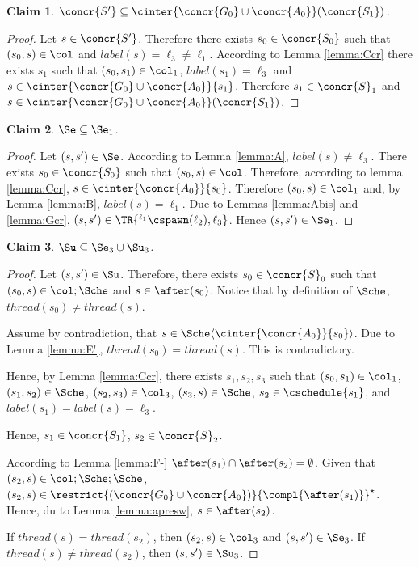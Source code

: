 \documentclass[12pt]{article}
\let\vide\emptyset \let\appartient\in
\let\firstunion\cup
\let\firstinter\cap
\let\emptyset\vide \let\in\appartient
\let\cup\firstunion
\let\cap\firstinter
\renewcommand{\subset}{\subseteq}
\newcommand{\li}[1]{ {}^{\ell_{#1}}  }
\newcommand{\lbl}{\mathit{label}}
\newcommand{\thread}{\mathit{thread}}
\newtheorem{claim}{Claim}
\begin{document}
\begin{claim}
 \(\concr{S'}\subset\cinter{\concr{G_0}\cup\concr{A_0}}(\concr{S_1})\).
\end{claim}
\begin{proof}
 Let \(s\in\concr{S'}\). Therefore there exists \(s_0\in\concr{S_0}\) such that \((s_0,s)\in\col\) and \(\lbl(s)=\ell_3\neq\ell_1\).
 According to Lemma \ref{lemma:Ccr} there exists \(s_1\) such that \((s_0,s_1)\in\col_1\), \(\lbl(s_1)=\ell_3\) and \(s\in\cinter{\concr{G_0}\cup\concr{A_0}}\{s_1\}\).
 Therefore \(s_1\in\concr{S}_1\) and \(s\in\cinter{\concr{G_0}\cup\concr{A_0}}(\concr{S_1})\).
\end{proof}

\begin{claim}
 \(\Se\subset\Se_1\).
\end{claim}
\begin{proof}
Let \((s,s')\in\Se\). According to Lemma \ref{lemma:A}, \(\lbl(s)\neq\ell_3\).
There exists \(s_0\in\concr{S_0}\) such that \((s_0,s)\in \col\).
Therefore, according to lemma \ref{lemma:Ccr}, \(s\in\cinter{\concr{A_0}}\{s_0\}\). Therefore \((s_0,s)\in\col_1\) and, by Lemma \ref{lemma:B}, \(\lbl(s)=\ell_1\). Due to Lemmas \ref{lemma:Abis} and \ref{lemma:Gcr}, \((s,s')\in\TR{\li1\cspawn(\ell_2),\ell_3}\).
Hence \((s,s')\in\Se_1\).
\end{proof}

\begin{claim}
 \(\Su\subset\Se_3\cup\Su_3\).
\end{claim}
\begin{proof}
Let \((s,s')\in \Su\).
Therefore, there exists \(s_0\in\concr{S}_0\) such that \((s_0,s)\in\col;\Sche\) and \(s\in\after(s_0)\).
Notice that by definition of \(\Sche\), \(\thread(s_0)\neq\thread(s)\).

Assume by contradiction, that \(s\in\Sche\langle\cinter{\concr{A_0}}\{s_0\}\rangle\).
Due to Lemma \ref{lemma:E'}, \(\thread(s_0)=\thread(s)\). This is contradictory.

Hence, by Lemma \ref{lemma:Ccr}, there exists \(s_1, s_2,s_3\) such that \((s_0,s_1)\in\col_1\), \((s_1,s_2)\in\Sche\), \((s_2,s_3)\in\col_3\), \((s_3,s)\in\Sche\), \(s_2\in\cschedule\{s_1\}\),  and  \(\lbl(s_1)=\lbl(s)=\ell_3\).

 Hence, \(s_1\in\concr{S_1}\), \(s_2\in\concr{S}_2\). 

 According to Lemma \ref{lemma:F-} \(\after(s_1)\cap\after(s_2)=\emptyset\). Given that \((s_2,s)\in\col;\Sche;\Sche\), \((s_2,s)\in \restrict{(\concr{G_0}\cup\concr{A_0})}{\compl{\after(s_1)}}^{\star}\).
 Hence, du to Lemma \ref{lemma:apresw}, \(s\in\after(s_2)\).
 
 If \(\thread(s)=\thread(s_2)\), then \((s_2,s)\in\col_3\) and \((s,s')\in\Se_3\).
 If \(\thread(s)\neq\thread(s_2)\), then \((s,s')\in\Su_3\).
\end{proof}
\end{document}
